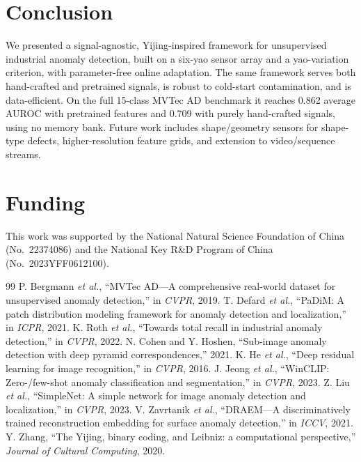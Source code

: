 \documentclass[journal,10pt]{IEEEtran}
\begin{document}
\section{Conclusion}
We presented a signal-agnostic, Yijing-inspired framework for unsupervised
industrial anomaly detection, built on a six-yao sensor array and a
yao-variation criterion, with parameter-free online adaptation. The same
framework serves both hand-crafted and pretrained signals, is robust to
cold-start contamination, and is data-efficient. On the full 15-class
MVTec AD benchmark it reaches 0.862 average AUROC with pretrained features
and 0.709 with purely hand-crafted signals, using no memory bank. Future
work includes shape/geometry sensors for shape-type defects, higher-resolution
feature grids, and extension to video/sequence streams.

\section*{Funding}
This work was supported by the National Natural Science Foundation of China
(No.\ 22374086) and the National Key R\&D Program of China (No.\ 2023YFF0612100).


\begin{thebibliography}{99}
 P. Bergmann \emph{et al.}, ``MVTec AD---A
comprehensive real-world dataset for unsupervised anomaly detection,''
in \emph{CVPR}, 2019.
 T. Defard \emph{et al.}, ``PaDiM: A patch
distribution modeling framework for anomaly detection and localization,''
in \emph{ICPR}, 2021.
 K. Roth \emph{et al.}, ``Towards total recall
in industrial anomaly detection,'' in \emph{CVPR}, 2022.
 N. Cohen and Y. Hoshen, ``Sub-image anomaly
detection with deep pyramid correspondences,'' 2021.
 K. He \emph{et al.}, ``Deep residual learning for
image recognition,'' in \emph{CVPR}, 2016.
 J. Jeong \emph{et al.}, ``WinCLIP: Zero-/few-shot
anomaly classification and segmentation,'' in \emph{CVPR}, 2023.
 Z. Liu \emph{et al.}, ``SimpleNet: A simple
network for image anomaly detection and localization,'' in \emph{CVPR}, 2023.
 V. Zavrtanik \emph{et al.}, ``DRAEM---A
discriminatively trained reconstruction embedding for surface anomaly
detection,'' in \emph{ICCV}, 2021.
 Y. Zhang, ``The Yijing, binary coding, and Leibniz:
a computational perspective,'' \emph{Journal of Cultural Computing}, 2020.
\end{thebibliography}
\end{document}
